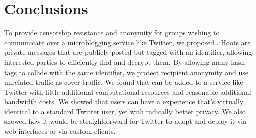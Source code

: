 \section{Conclusions}

To provide censorship resistance and anonymity for groups wishing to
communicate over a microblogging service like Twitter, we proposed
\hoot. Hoots are private messages that are publicly posted but tagged
with an identifier, allowing interested parties to efficiently find and
decrypt them. By allowing many hash tags to collide with the same
identifier, we protect recipient anonymity and use unrelated traffic as
cover traffic. We found that \hoot can be added to a service like
Twitter with little additional computational resources and reasonable
additional bandwidth costs. We showed that users can have a experience
that's virtually identical to a standard Twitter user, yet with
radically better privacy. We also showed how it would be straightforward
for Twitter to adopt \hoot and deploy it via web interfaces or via
custom clients.
